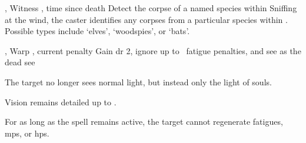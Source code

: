  {\mFate, \mAir}%
  {Witness}%
  {\distant, \detailed}%
  {time since death}%
  {Detect the corpse of a named species within \spellRange}%
  {
    Sniffing at the wind, the caster identifies any corpses from a particular species within \spellRange.
    Possible types include `elves', `woodspies', or `bats'.
  }

  {\mFate, \mAir}%
  {Warp}%
  {\distant, \detailed}%
  {current  penalty}%
  {Gain \gls{dr} 2, ignore up to ~\gls{fatigue} penalties, and see as the dead see}%
  {
    The target no longer sees normal light, but instead only the light of souls.

    Vision remains detailed up to \spellRange.

    For as long as the spell remains active, the target cannot regenerate \glspl{fatigue}, \glspl{mp}, or \glspl{hp}.
  }

